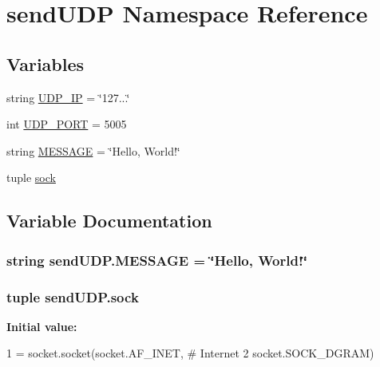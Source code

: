 \hypertarget{namespacesendUDP}{}\section{send\+U\+D\+P Namespace Reference}
\label{namespacesendUDP}
\subsection*{Variables}
\begin{DoxyCompactItemize}
\item 
string \hyperlink{namespacesendUDP_a9081c3225be4bae104e96f9c92ff7bc8}{U\+D\+P\+\_\+\+I\+P} = \char`\"{}127...\char`\"{}
\item 
int \hyperlink{namespacesendUDP_aae28edb5862eaed0f81c624f977dff16}{U\+D\+P\+\_\+\+P\+O\+R\+T} = 5005
\item 
string \hyperlink{namespacesendUDP_a8fa1a3284b414db12e19ef0228febcbf}{M\+E\+S\+S\+A\+G\+E} = \char`\"{}Hello, World!\char`\"{}
\item 
tuple \hyperlink{namespacesendUDP_a9bebd9c6e93fa09728d7b2ef5d737dcf}{sock}
\end{DoxyCompactItemize}


\subsection{Variable Documentation}
\hypertarget{namespacesendUDP_a8fa1a3284b414db12e19ef0228febcbf}{}
\subsubsection[{M\+E\+S\+S\+A\+G\+E}]{\setlength{\rightskip}{0pt plus 5cm}string send\+U\+D\+P.\+M\+E\+S\+S\+A\+G\+E = \char`\"{}Hello, World!\char`\"{}}\label{namespacesendUDP_a8fa1a3284b414db12e19ef0228febcbf}
\hypertarget{namespacesendUDP_a9bebd9c6e93fa09728d7b2ef5d737dcf}{}
\subsubsection[{sock}]{\setlength{\rightskip}{0pt plus 5cm}tuple send\+U\+D\+P.\+sock}\label{namespacesendUDP_a9bebd9c6e93fa09728d7b2ef5d737dcf}
{\bfseries Initial value\+:}
\begin{DoxyCode}
1 = socket.socket(socket.AF\_INET, \textcolor{comment}{# Internet}
2                      socket.SOCK\_DGRAM)
\end{DoxyCode}
\hypertarget{namespacesendUDP_a9081c3225be4bae104e96f9c92ff7bc8}{}
